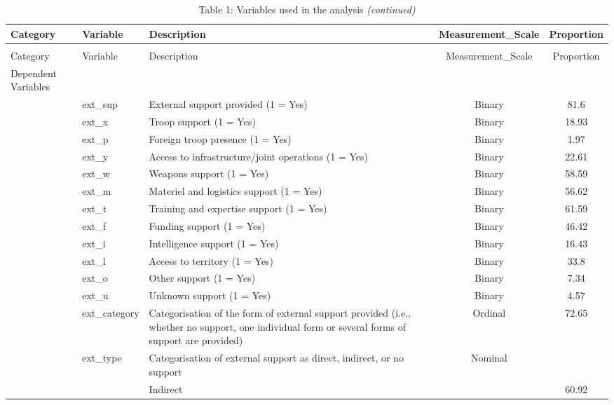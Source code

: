 \documentclass[
]{article}
\begin{document}
\begin{landscape}
\begingroup\fontsize{7}{9}\selectfont

\begin{longtable}[t]{ll>{\raggedright\arraybackslash}p{6cm}cc}
\caption{\label{tab:Table 1: Variable Table}Table 1: Variables used in the analysis}\\
\toprule
Category & Variable & Description & Measurement\_Scale & Proportion\\
\midrule
\endfirsthead
\caption[]{Table 1: Variables used in the analysis \textit{(continued)}}\\
\toprule
Category & Variable & Description & Measurement\_Scale & Proportion\\
\midrule
\endhead

\endfoot
\bottomrule
\endlastfoot
Dependent Variables &  &  &  & \\
 & ext\_sup & External support provided (1 = Yes) & Binary & 81.6\\
 & ext\_x & Troop support (1 = Yes) & Binary & 18.93\\
 & ext\_p & Foreign troop presence (1 = Yes) & Binary & 1.97\\
 & ext\_y & Access to infrastructure/joint operations (1 = Yes) & Binary & 22.61\\
\addlinespace
 & ext\_w & Weapons support (1 = Yes) & Binary & 58.59\\
 & ext\_m & Materiel and logistics support (1 = Yes) & Binary & 56.62\\
 & ext\_t & Training and expertise support (1 = Yes) & Binary & 61.59\\
 & ext\_f & Funding support (1 = Yes) & Binary & 46.42\\
 & ext\_i & Intelligence support (1 = Yes) & Binary & 16.43\\
\addlinespace
 & ext\_l & Access to territory (1 = Yes) & Binary & 33.8\\
 & ext\_o & Other support (1 = Yes) & Binary & 7.34\\
 & ext\_u & Unknown support (1 = Yes) & Binary & 4.57\\
 & ext\_category & Categorisation of the form of external support provided (i.e.,  whether no support, one individual form or several forms of support are provided) & Ordinal & 72.65\\
 & ext\_type & Categorisation of external support as direct, indirect, or no support & Nominal & \\
\addlinespace
 &  & Indirect &  & 60.92\\

\end{longtable}
\end{landscape}
\end{document}
